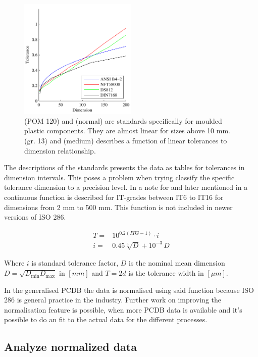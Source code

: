 \documentclass[aip,amsmath, reprint, author-year]{revtex4-1}
\begin{document}
\begin{figure}
\includegraphics[width=0.5\textwidth]{Tolerance_standards.pdf}
\caption{\label{fig:tolstd} \citeauthor{DIN16901} (POM 120) and \citeauthor{NFT58000} (normal) are standards specifically for moulded plastic components. They are almost linear for sizes above 10 mm. 
\citeauthor{american1978preferred} (gr. 13) and \citeauthor{DIN7168} (medium) describes a function of linear tolerances to dimension relationship.}
\end{figure}

The descriptions of the standards presents the data as tables for tolerances in dimension intervals. This poses a problem when trying classify the specific tolerance dimension to a precision level.
In a note for \citeauthor{american1978preferred} and later mentioned in \citeauthor{ISO286} a continuous function is described for IT-grades between IT6 to IT16 for dimensions from 2 mm to 500 mm. This function is not included in newer versions of ISO 286.

\begin{align}
	T =& 10^{0.2 (ITG -1)} \cdot i \\
	i =& 0.45 \sqrt[3]{D} + 10^{-3} \, D 
\end{align}

Where $i$ is standard tolerance factor, $D$ is the nominal mean dimension $D = \sqrt{D_{\textrm{min}} D_\textrm{max}}$ in $[mm]$ and $T = 2 d$ is the tolerance width in $[\mu m]$. 

In the generalised PCDB the data is normalised using said function because ISO 286 is general practice in the industry. 
Further work on improving the normalisation feature is possible, when more PCDB data is available and it's possible to do an fit to the actual data for the different processes.

\subsection{Analyze normalized data}
\end{document}
